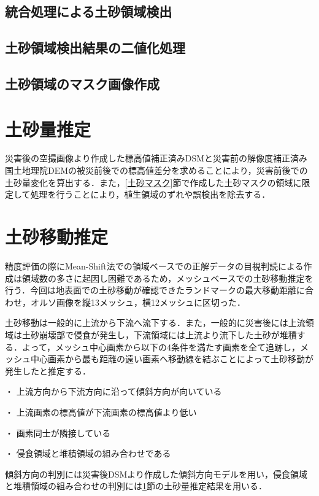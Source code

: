     \subsection{統合処理による土砂領域検出}
    \subsection{土砂領域検出結果の二値化処理}
    \subsection{土砂領域のマスク画像作成}

  
  \section{土砂量推定}
    \label{土砂量推定}
    災害後の空撮画像より作成した標高値補正済みDSMと災害前の解像度補正済み国土地理院DEMの被災前後での標高値差分を求めることにより，災害前後での土砂量変化を算出する．また，\ref{土砂マスク}節で作成した土砂マスクの領域に限定して処理を行うことにより，植生領域のずれや誤検出を除去する．
  

  \section{土砂移動推定}
    \label{土砂移動推定}
    精度評価の際にMean-Shift法での領域ベースでの正解データの目視判読による作成は領域数の多さに起因し困難であるため，メッシュベースでの土砂移動推定を行う．今回は地表面での土砂移動が確認できたランドマークの最大移動距離に合わせ，オルソ画像を縦13メッシュ，横12メッシュに区切った．

    土砂移動は一般的に上流から下流へ流下する．また，一般的に災害後には上流領域は土砂崩壊部で侵食が発生し，下流領域には上流より流下した土砂が堆積する．よって，メッシュ中心画素から以下の4条件を満たす画素を全て追跡し，メッシュ中心画素から最も距離の遠い画素へ移動線を結ぶことによって土砂移動が発生したと推定する．

    ・	上流方向から下流方向に沿って傾斜方向が向いている

    ・	上流画素の標高値が下流画素の標高値より低い
    
    ・	画素同士が隣接している
    
    ・	侵食領域と堆積領域の組み合わせである

    傾斜方向の判別には災害後DSMより作成した傾斜方向モデルを用い，侵食領域と堆積領域の組み合わせの判別には\ref{土砂量推定}節の土砂量推定結果を用いる．
  

